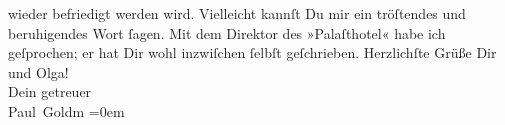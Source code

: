 \begin{ledgroupsized}[t]{13cm}
                  {\pb}wieder befriedigt werden wird. Vielleicht kannſt
               Du mir ein tröſtendes und beruhigendes Wort ſagen. Mit dem Direktor des »Palaſthotel« habe ich geſprochen; er hat Dir wohl inzwiſchen
               ſelbſt geſchrieben.\pend
           \pstart
           Herzlichſte Grüße Dir und Olga! {\\[\baselineskip]}Dein
               getreuer {\\[\baselineskip]}\spacefill\mbox{Paul Goldm}\pend
           \leftskip=0em{}
         
         \endnumbering{}\end{ledgroupsized}  \newcommand{\dateiname}{L03361}\newcommand{\titel}{Paul Goldmann an Arthur Schnitzler, 27. 1. [1903]}\newcommand{\editorInnen}{Martin Anton Müller und Laura Untner}
      